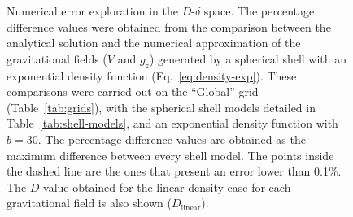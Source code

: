 \documentclass[extra, referee]{gji}
\begin{document}
\begin{figure}
\centering
{}
\caption{
    Numerical error exploration in the $D$-$\delta$ space.
    The percentage difference values were obtained from the comparison between the
    analytical solution and the numerical approximation of the gravitational fields ($V$
    and $g_z$) generated by a spherical shell with an exponential density function
    (Eq.~\ref{eq:density-exp}).
    These comparisons were carried out on the ``Global'' grid (Table~\ref{tab:grids}),
    with the spherical shell models detailed in Table~\ref{tab:shell-models}, and an
    exponential density function with $b = 30$.
    The percentage difference values are obtained as the maximum difference
    between every shell model.
    The points inside the dashed line are the ones that present an error lower than
    0.1\%.
    The $D$ value obtained for the linear density case for each gravitational field is
    also shown ($D_\text{linear}$).
    }
\label{fig:grid-search}
\end{figure}
\end{document}

